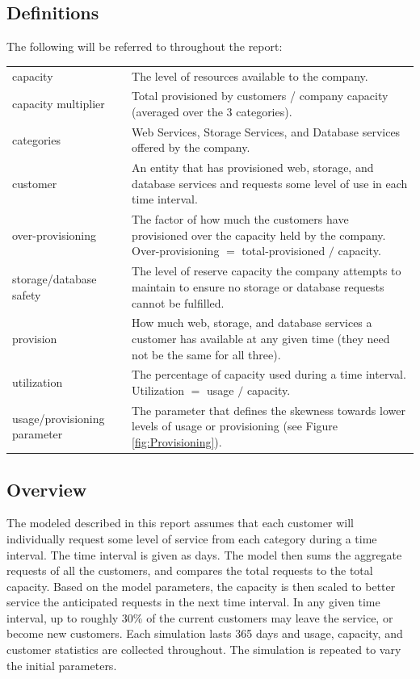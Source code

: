 \documentclass[12pt]{article} %
\begin{document}
\subsection{Definitions}
The following will be referred to throughout the report:
\begin{center}
    \begin{longtable}{p{4cm} p{10cm}}
        capacity & The level of resources available to the company.\\
        capacity multiplier & Total provisioned by customers / company capacity (averaged over the 3 categories).\\
                 categories & Web Services, Storage Services, and Database services offered by the company.\\
        customer & An entity that has provisioned web, storage, and database services and requests some level of use in each time interval.\\
        over-provisioning & The factor of how much the customers have provisioned over the capacity held by the company.  Over-provisioning \(=\) total-provisioned \(/\) capacity.\\
  storage/database safety & The level of reserve capacity the company attempts to maintain to ensure no storage or database requests cannot be fulfilled.\\
       provision & How much web, storage, and database services a customer has available at any given time (they need not be the same for all three).\\
     utilization & The percentage of capacity used during a time interval.  Utilization \(=\) usage \(/\) capacity.\\
        usage/provisioning parameter & The parameter that defines the skewness towards lower levels of usage or provisioning (see Figure \ref{fig:Provisioning}).

    \end{longtable}
\end{center}
\subsection{Overview}
    The modeled described in this report assumes that each customer will individually request some level of service from each category during a time interval.  The time interval is given as days.  
    The model then sums the aggregate requests of all the customers, and compares the total requests to the total capacity.
    Based on the model parameters, the capacity is then scaled to better service the anticipated requests in the next time interval.
    In any given time interval, up to roughly 30\% of the current customers may leave the service, or become new customers.
    Each simulation lasts 365 days and usage, capacity, and customer statistics are collected throughout.
    The simulation is repeated to vary the initial parameters.
\end{document}
